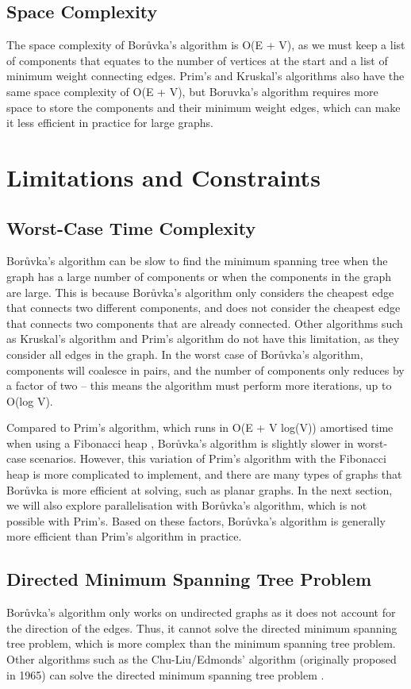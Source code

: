 \documentclass[a4paper, 11pt]{article}
\begin{document}
\subsection{Space Complexity}
The space complexity of Borůvka's algorithm is O(E + V), as we must keep a list of components that equates to the number of vertices at the start and a list of minimum weight connecting edges. Prim's and Kruskal's algorithms also have the same space complexity of O(E + V), but Boruvka's algorithm requires more space to store the components and their minimum weight edges, which can make it less efficient in practice for large graphs.

\section{Limitations and Constraints}

\subsection{Worst-Case Time Complexity}
Borůvka's algorithm can be slow to find the minimum spanning tree when the graph has a large number of components or when the components in the graph are large. This is because Borůvka's algorithm only considers the cheapest edge that connects two different components, and does not consider the cheapest edge that connects two components that are already connected. Other algorithms such as Kruskal's algorithm and Prim's algorithm do not have this limitation, as they consider all edges in the graph. In the worst case of Borůvka's algorithm, components will coalesce in pairs, and the number of components only reduces by a factor of two -- this means the algorithm must perform more iterations, up to O(log V). 

Compared to Prim's algorithm, which runs in O(E + V log(V)) amortised time when using a Fibonacci heap \cite{fredman1987fibonacci}, Borůvka's algorithm is slightly slower in worst-case scenarios. However, this variation of Prim's algorithm with the Fibonacci heap is more complicated to implement, and there are many types of graphs that Borůvka is more efficient at solving, such as planar graphs. In the next section, we will also explore parallelisation with Borůvka's algorithm, which is not possible with Prim's. Based on these factors, Borůvka's algorithm is generally more efficient than Prim's algorithm in practice.

\subsection{Directed Minimum Spanning Tree Problem}
Borůvka's algorithm only works on undirected graphs as it does not account for the direction of the edges. Thus, it cannot solve the directed minimum spanning tree problem, which is more complex than the minimum spanning tree problem. Other algorithms such as the Chu-Liu/Edmonds' algorithm (originally proposed in 1965) can solve the directed minimum spanning tree problem \cite{gabow1986efficient}.
\end{document}
